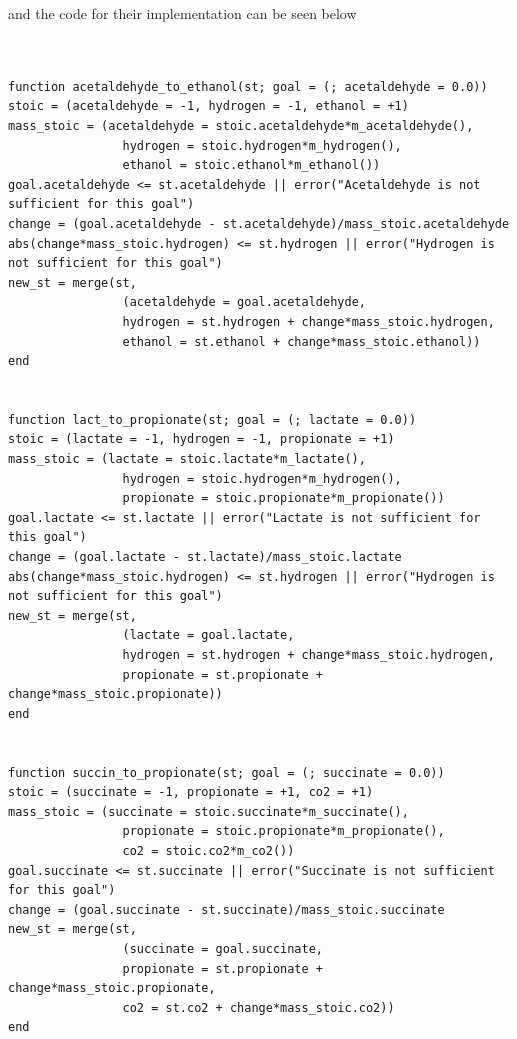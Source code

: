 \documentclass[11pt]{article}
\begin{document}
and the code for their implementation can be seen below
\begin{verbatim}


function acetaldehyde_to_ethanol(st; goal = (; acetaldehyde = 0.0))
stoic = (acetaldehyde = -1, hydrogen = -1, ethanol = +1)
mass_stoic = (acetaldehyde = stoic.acetaldehyde*m_acetaldehyde(),
                hydrogen = stoic.hydrogen*m_hydrogen(),
                ethanol = stoic.ethanol*m_ethanol())
goal.acetaldehyde <= st.acetaldehyde || error("Acetaldehyde is not sufficient for this goal")
change = (goal.acetaldehyde - st.acetaldehyde)/mass_stoic.acetaldehyde
abs(change*mass_stoic.hydrogen) <= st.hydrogen || error("Hydrogen is not sufficient for this goal")
new_st = merge(st,
                (acetaldehyde = goal.acetaldehyde,
                hydrogen = st.hydrogen + change*mass_stoic.hydrogen,
                ethanol = st.ethanol + change*mass_stoic.ethanol))
end


function lact_to_propionate(st; goal = (; lactate = 0.0))
stoic = (lactate = -1, hydrogen = -1, propionate = +1)
mass_stoic = (lactate = stoic.lactate*m_lactate(),
                hydrogen = stoic.hydrogen*m_hydrogen(),
                propionate = stoic.propionate*m_propionate())
goal.lactate <= st.lactate || error("Lactate is not sufficient for this goal")
change = (goal.lactate - st.lactate)/mass_stoic.lactate
abs(change*mass_stoic.hydrogen) <= st.hydrogen || error("Hydrogen is not sufficient for this goal")
new_st = merge(st,
                (lactate = goal.lactate,
                hydrogen = st.hydrogen + change*mass_stoic.hydrogen,
                propionate = st.propionate + change*mass_stoic.propionate))
end


function succin_to_propionate(st; goal = (; succinate = 0.0))
stoic = (succinate = -1, propionate = +1, co2 = +1)
mass_stoic = (succinate = stoic.succinate*m_succinate(),
                propionate = stoic.propionate*m_propionate(),
                co2 = stoic.co2*m_co2())
goal.succinate <= st.succinate || error("Succinate is not sufficient for this goal")
change = (goal.succinate - st.succinate)/mass_stoic.succinate
new_st = merge(st,
                (succinate = goal.succinate,
                propionate = st.propionate + change*mass_stoic.propionate,
                co2 = st.co2 + change*mass_stoic.co2))
end


\end{verbatim}
\end{document}
